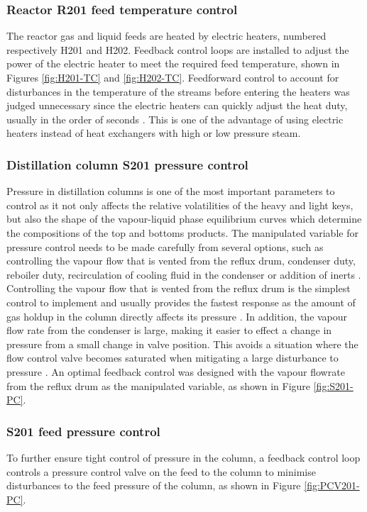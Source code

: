 \subsubsection{Reactor R201 feed temperature control}%
The reactor gas and liquid feeds are heated by electric heaters, numbered respectively H201 and H202. Feedback control loops are installed to adjust the power of the electric heater to meet the required feed temperature, shown in Figures \ref{fig:H201-TC} and \ref{fig:H202-TC}. Feedforward control to account for disturbances in the temperature of the streams before entering the heaters was judged unnecessary since the electric heaters can quickly adjust the heat duty, usually in the order of seconds \cite{wattco_flanged_nodate}. This is one of the advantage of using electric heaters instead of heat exchangers with high or low  pressure steam.


\subsubsection{Distillation column S201 pressure control} %
Pressure in distillation columns is one of the most important parameters to control as it not only affects the relative volatilities of the heavy and light keys, but also the shape of the vapour-liquid phase equilibrium curves which determine the compositions of the top and bottoms products\cite{kister_distillation_1990}. The manipulated variable for pressure control needs to be made carefully from several options, such as controlling the vapour flow that is vented from the reflux drum, condenser duty, reboiler duty, recirculation of cooling fluid in the condenser or addition of inerts \cite{kister_distillation_1990}. Controlling the vapour flow that is vented from the reflux drum is the simplest control to implement and usually provides the fastest response as the amount of gas holdup in the column directly affects its pressure \cite{riggs_distillation_2015,kister_distillation_1990}. In addition, the vapour flow rate from the condenser is large, making it easier to effect a change in pressure from a small change in valve position. This avoids a situation where the flow control valve becomes saturated when mitigating a large disturbance to pressure \cite{luyben_practical_1992}. 
An optimal feedback control was designed with the vapour flowrate from the reflux drum as the manipulated variable, as shown in Figure \ref{fig:S201-PC}.

\subsubsection{S201 feed pressure control} %
To further ensure tight control of pressure in the column, a feedback control loop controls a pressure control valve on the feed to the column to minimise disturbances to the feed pressure of the column, as shown in Figure \ref{fig:PCV201-PC}.

